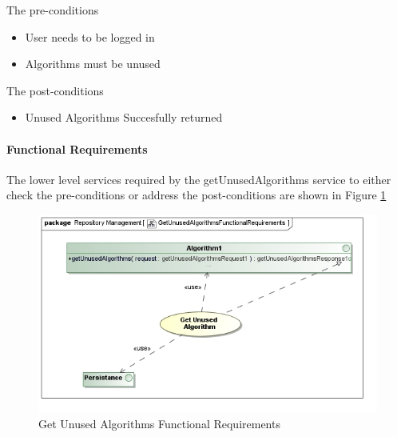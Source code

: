The pre-conditions
\begin{itemize}
  \item User needs to be logged in
  \item Algorithms must be unused
\end{itemize}

The post-conditions
\begin{itemize}
  \item Unused Algorithms Succesfully returned
\end{itemize}

\paragraph{Functional Requirements}
The lower level services required by the getUnusedAlgorithms service to either check the
pre-conditions or address the post-conditions are shown in Figure \ref{fig:getUnusedAlgorithmsFR}
\begin{figure}[H]
  \begin{center}
  \includegraphics[scale=0.6]{../Diagrams and Charts/Test Data/GetUnusedAlgorithmsFunctionalRequirements.jpg}
  \caption{Get Unused Algorithms Functional Requirements}
  \label{fig:getUnusedAlgorithmsFR}
  \end{center}
\end{figure}

